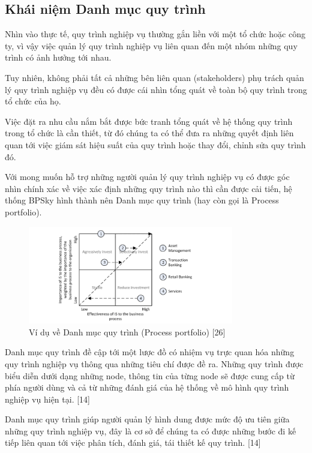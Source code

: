 \subsection{Khái niệm Danh mục quy trình}

Nhìn vào thực tế, quy trình nghiệp vụ thường gắn liền với một tổ chức hoặc công ty, vì vậy việc quản lý quy trình nghiệp vụ liên quan đến một nhóm những quy trình có ảnh hưởng tới nhau. 

Tuy nhiên, không phải tất cả những bên liên quan (stakeholders) phụ trách quản lý quy trình nghiệp vụ đều có được cái nhìn tổng quát về toàn bộ quy trình trong tổ chức của họ. 

Việc đặt ra nhu cầu nắm bắt được bức tranh tổng quát về hệ thống quy trình trong tổ chức là cần thiết, từ đó chúng ta có thể đưa ra những quyết định liên quan tới việc giám sát hiệu suất của quy trình hoặc thay đổi, chỉnh sửa quy trình đó.

Với mong muốn hỗ trợ những người quản lý quy trình nghiệp vụ có được góc nhìn chính xác về việc xác định những quy trình nào thì cần được cải tiến, hệ thống BPSky hình thành nên Danh mục quy trình (hay còn gọi là Process portfolio). 

\begin{figure}[H]
    \begin{center}
        \includegraphics[width=0.8\textwidth]{Content/Cơ sở lý thuyết/documents/Process portfolio/images/ProcessPortfolioIllustration.png}
        \vspace{0.5cm}
        \caption{Ví dụ về Danh mục quy trình (Process portfolio) [26]}
        \label{fig: Ví dụ về Danh mục quy trình (Process portfolio)}
    \end{center}
\end{figure}

Danh mục quy trình đề cập tới một lược đồ có nhiệm vụ trực quan hóa những quy trình nghiệp vụ thông qua những tiêu chí được đề ra. Những quy trình được biểu diễn dưới dạng những node, thông tin của từng node sẽ được cung cấp từ phía người dùng và cả từ những đánh giá của hệ thống về mô hình quy trình nghiệp vụ hiện tại. [14]

Danh mục quy trình giúp người quản lý hình dung được mức độ ưu tiên giữa những quy trình nghiệp vụ, đây là cơ sở để chúng ta có được những bước đi kế tiếp liên quan tới việc phân tích, đánh giá, tái thiết kế quy trình. [14]